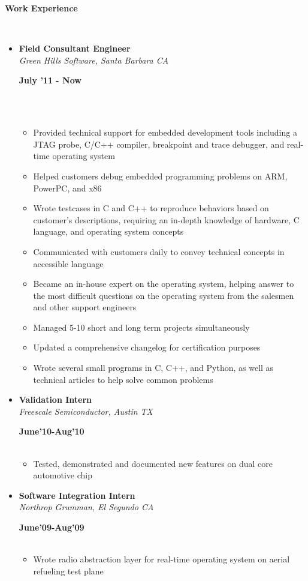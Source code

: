 \documentclass[a4paper,11pt]{article}
\newcommand{\isep}{-2 pt}
\newcommand{\lsep}{-0.2cm}
\newcommand{\resheading}[1]{{\small \colorbox{mygrey}{\begin{minipage}{0.975\textwidth}{\textbf{#1 \vphantom{p\^{E}}}}\end{minipage}}}}
\newcommand{\workexp}[4]{
\begin{minipage}[t]{7cm}
\begin{flushleft}
\textbf{#1} \\
\indent \emph{#2}\\
\end{flushleft}
\end{minipage}
\hfill
\begin{minipage}[t]{7cm}
\begin{flushright}
\textbf{#3} \\
\indent #4 \\
\end{flushright}
\end{minipage}
}
\begin{document}
\resheading{\textbf{Work Experience} }\\[\lsep]
\begin{itemize}
\item 
\workexp{Field Consultant Engineer}{Green Hills Software, Santa Barbara CA}{July '11 - Now}{}
\\[-0.2cm]
	\begin{itemize}\itemsep \isep
	\item Provided technical support for embedded development tools including a JTAG probe, C/C++ compiler, breakpoint and trace debugger, and real-time operating system
	\item Helped customers debug embedded programming problems on ARM, PowerPC, and x86
	\item Wrote testcases in C and C++ to reproduce behaviors based on customer's descriptions, requiring an in-depth knowledge of hardware, C language, and operating system concepts
	\item Communicated with customers daily to convey technical concepts in accessible language
	\item Became an in-house expert on the operating system, helping answer to the most difficult questions on the operating system from the salesmen and other support engineers
	\item Managed 5-10 short and long term projects simultaneously
	\item Updated a comprehensive changelog for certification purposes
	\item Wrote several small programs in C, C++, and Python, as well as technical articles to help solve common problems
	\end{itemize}

\item
\workexp{Validation Intern}{Freescale Semiconductor, Austin TX}{June'10-Aug'10}{}
	\begin{itemize}\itemsep \isep
	\item Tested, demonstrated and documented new features on dual core automotive chip
	\end{itemize}
\item
\workexp{Software Integration Intern}{Northrop Grumman, El Segundo CA}{June'09-Aug'09}{}
	\begin{itemize}\itemsep \isep
	\item Wrote radio abstraction layer for real-time operating system on aerial refueling test plane
	\end{itemize}
\end{itemize}
\end{document}
